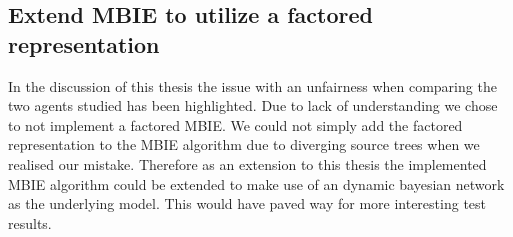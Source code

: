 \subsection{Extend MBIE to utilize a factored representation}
\label{sec:factored_mbie}

In the discussion of this thesis the issue with an unfairness when
comparing the two agents studied has been highlighted. Due to lack of
understanding we chose to not implement a factored MBIE. We could not simply
add the factored representation to the MBIE algorithm due to diverging source
trees when we realised our mistake. Therefore as an extension to this thesis
the implemented MBIE algorithm could be extended to make use of an dynamic
bayesian network as the underlying model. This would have paved way for more
interesting test results.
